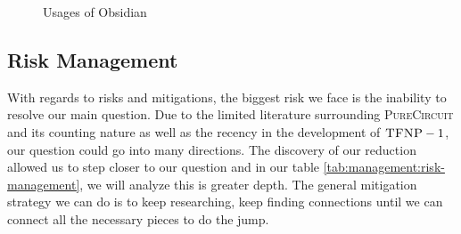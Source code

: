 \begin{figure}[h!]
    \centering
    \caption{Usages of Obsidian}
    \label{fig:theory:obsidian-usages}
\end{figure}



\subsection{Risk Management}

With regards to risks and mitigations, the biggest risk we face
is the inability to resolve our main question. Due to the
limited literature surrounding \textsc{PureCircuit} and its
counting nature as well as the recency in the development of
$\textsc{TFNP} -1$, our question could go into many directions.
The discovery of our reduction allowed us to step closer to our question
and in our table \ref{tab:management:risk-management}, we will analyze this is greater depth.
The general mitigation strategy we can do is to keep researching, keep
finding connections until we can connect all the necessary pieces to do the jump.

